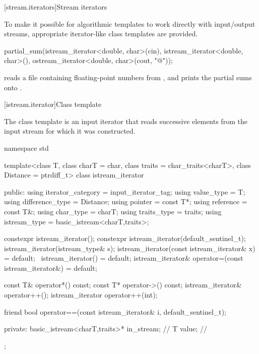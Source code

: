 [stream.iterators]{Stream iterators}

\pnum
To make it possible for algorithmic templates to work directly with input/output streams, appropriate
iterator-like
class templates
are provided.

\begin{example}
\begin{codeblock}
partial_sum(istream_iterator<double, char>(cin),
  istream_iterator<double, char>(),
  ostream_iterator<double, char>(cout, "@\textbackslash@n"));
\end{codeblock}

reads a file containing floating-point numbers from
,
and prints the partial sums onto
.
\end{example}

[istream.iterator]{Class template }

\pnum
{}%
The class template 
is an input iterator that reads successive elements
from the input stream for which it was constructed.

\begin{codeblock}
namespace std {
  template<class T, class charT = char, class traits = char_traits<charT>,
           class Distance = ptrdiff_t>
  class istream_iterator {
  public:
    using iterator_category = input_iterator_tag;
    using value_type        = T;
    using difference_type   = Distance;
    using pointer           = const T*;
    using reference         = const T&;
    using char_type         = charT;
    using traits_type       = traits;
    using istream_type      = basic_istream<charT,traits>;

    constexpr istream_iterator();
    constexpr istream_iterator(default_sentinel_t);
    istream_iterator(istream_type& s);
    istream_iterator(const istream_iterator& x) = default;
    ~istream_iterator() = default;
    istream_iterator& operator=(const istream_iterator&) = default;

    const T& operator*() const;
    const T* operator->() const;
    istream_iterator& operator++();
    istream_iterator  operator++(int);

    friend bool operator==(const istream_iterator& i, default_sentinel_t);

  private:
    basic_istream<charT,traits>* in_stream; // \expos
    T value;                                // \expos
  };
}
\end{codeblock}

